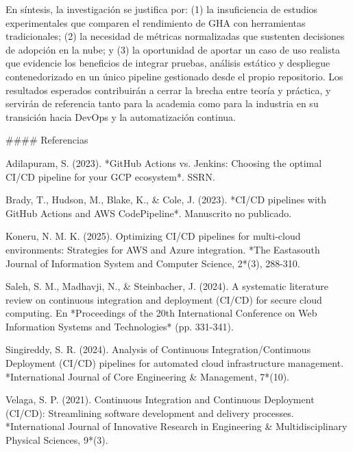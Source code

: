 En síntesis, la investigación se justifica por: (1) la insuficiencia de estudios experimentales que comparen el rendimiento de GHA con herramientas tradicionales; (2) la necesidad de métricas normalizadas que sustenten decisiones de adopción en la nube; y (3) la oportunidad de aportar un caso de uso realista que evidencie los beneficios de integrar pruebas, análisis estático y despliegue contenedorizado en un único pipeline gestionado desde el propio repositorio. Los resultados esperados contribuirán a cerrar la brecha entre teoría y práctica, y servirán de referencia tanto para la academia como para la industria en su transición hacia DevOps y la automatización continua.

#### Referencias

Adilapuram, S. (2023). *GitHub Actions vs. Jenkins: Choosing the optimal CI/CD pipeline for your GCP ecosystem*. SSRN.

Brady, T., Hudson, M., Blake, K., & Cole, J. (2023). *CI/CD pipelines with GitHub Actions and AWS CodePipeline*. Manuscrito no publicado.

Koneru, N. M. K. (2025). Optimizing CI/CD pipelines for multi-cloud environments: Strategies for AWS and Azure integration. *The Eastasouth Journal of Information System and Computer Science, 2*(3), 288-310.

Saleh, S. M., Madhavji, N., & Steinbacher, J. (2024). A systematic literature review on continuous integration and deployment (CI/CD) for secure cloud computing. En *Proceedings of the 20th International Conference on Web Information Systems and Technologies* (pp. 331-341).

Singireddy, S. R. (2024). Analysis of Continuous Integration/Continuous Deployment (CI/CD) pipelines for automated cloud infrastructure management. *International Journal of Core Engineering & Management, 7*(10).

Velaga, S. P. (2021). Continuous Integration and Continuous Deployment (CI/CD): Streamlining software development and delivery processes. *International Journal of Innovative Research in Engineering & Multidisciplinary Physical Sciences, 9*(3).

